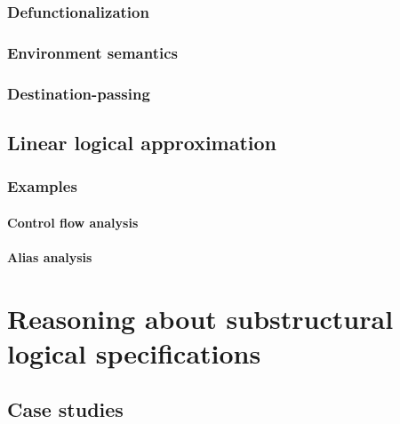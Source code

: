 \documentclass[12pt]{cmuthesis}
\begin{document}
\section{Defunctionalization}

\section{Environment semantics}

\section{Destination-passing}

\chapter{Linear logical approximation}


\section{}

\section{Examples}

\subsection{Control flow analysis}

\subsection{Alias analysis}

\part{Reasoning about substructural logical specifications}

\chapter{Case studies}


\end{document}
